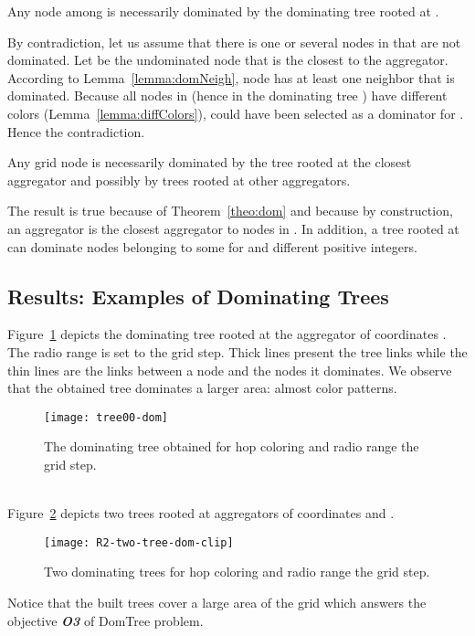 \begin{theorem}\label{theo:dom}
Any node among  is necessarily dominated by the dominating tree rooted at .
\end{theorem}

\proof
By contradiction, let us assume that there is one or several nodes in  that are not dominated. Let  be the undominated node that is the closest to the aggregator. 
According to Lemma~\ref{lemma:domNeigh}, node  has at least one neighbor  that is dominated. Because all nodes in  (hence in the dominating tree ) have different colors (Lemma~\ref{lemma:diffColors}),  could have been selected as a dominator for . Hence the contradiction. \endproof

\begin{corollary}\label{coro:closest}
Any grid node is necessarily dominated by the tree rooted at the closest aggregator and possibly by trees rooted at other aggregators. 
\end{corollary}
\proof
The result is true because of Theorem~\ref{theo:dom} and because by construction, an aggregator  is the closest aggregator to nodes in . In addition, a tree    
rooted at  can dominate nodes belonging to some  for  and  different positive integers.
\endproof

\subsection{Results: Examples of Dominating Trees}
Figure~\ref{fig:tree} depicts the dominating tree rooted at the aggregator of coordinates . The radio range is set to the grid step. Thick lines present the tree links while the thin lines are the links between a node and the nodes it dominates. We observe that the obtained tree dominates a larger area: almost  color patterns.
\begin{figure}[!h]
\centering
\texttt{[image: tree00-dom]}
\caption{The dominating tree obtained for  hop coloring and radio range  the grid step.\label{fig:tree}}
\end{figure}
~~ \\
Figure~\ref{fig:twoTrees} depicts two trees rooted at aggregators of coordinates  and . \begin{figure}[!h]
\centering
{\texttt{[image: R2-two-tree-dom-clip]}}\caption{Two dominating trees for  hop coloring and radio range  the grid step.\label{fig:twoTrees}}
\end{figure}

Notice that the built trees cover a large area of the grid which answers the objective \textbf{\textit{O3}} of DomTree problem.


